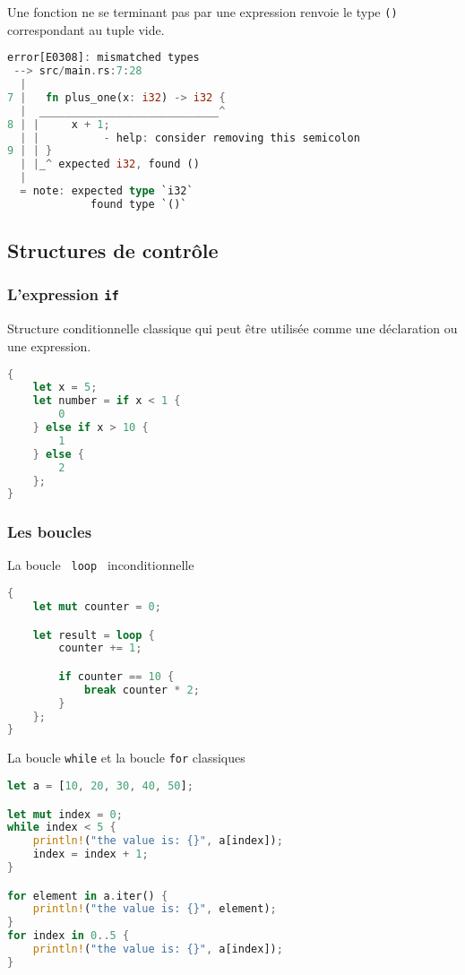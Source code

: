 \begin{frame}[fragile]
  Une fonction ne se terminant pas par une expression renvoie le type \texttt{()} correspondant au tuple vide.
  \begin{lstlisting}[language=rust]
error[E0308]: mismatched types
 --> src/main.rs:7:28
  |
7 |   fn plus_one(x: i32) -> i32 {
  |  ____________________________^
8 | |     x + 1;
  | |          - help: consider removing this semicolon
9 | | }
  | |_^ expected i32, found ()
  |
  = note: expected type `i32`
             found type `()`
  \end{lstlisting}
\end{frame}

\subsection{Structures de contrôle}
\begin{frame}[fragile]
  \frametitle{L'expression \texttt{if}}
Structure conditionnelle classique qui peut être utilisée comme une déclaration ou une expression.
\begin{lstlisting}[language=rust]
{
    let x = 5;
    let number = if x < 1 {
        0
    } else if x > 10 {
        1
    } else {
        2
    };
}
\end{lstlisting}  
\end{frame}
\begin{frame}[fragile]
  \frametitle{Les boucles}
La boucle \texttt{ loop } inconditionnelle
  \begin{lstlisting}[language=rust]
{
    let mut counter = 0;

    let result = loop {
        counter += 1;

        if counter == 10 {
            break counter * 2;
        }
    };
}
  \end{lstlisting}
\end{frame}
\begin{frame}[fragile]
  La boucle \texttt{while} et la boucle \texttt{for} classiques
  \begin{lstlisting}[language=rust]
let a = [10, 20, 30, 40, 50];

let mut index = 0;
while index < 5 {
    println!("the value is: {}", a[index]);
    index = index + 1;
}

for element in a.iter() {
    println!("the value is: {}", element);
}
for index in 0..5 {
    println!("the value is: {}", a[index]);
}
  \end{lstlisting}
\end{frame}
